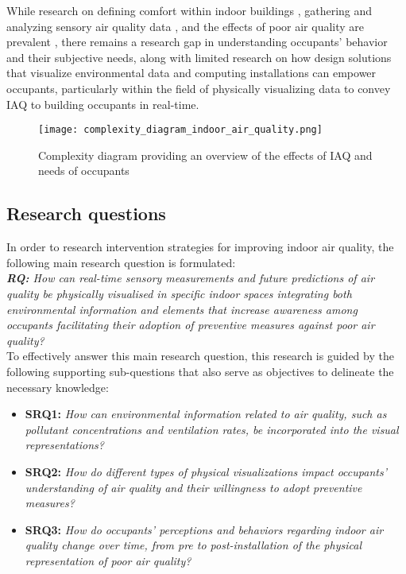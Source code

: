 While research on defining comfort within indoor buildings \cite{alavi_comfort_2017}, gathering and analyzing sensory air quality data \cite{corlan_importance_2021}, and the effects of poor air quality are prevalent \cite{klepeis_national_2001}, there remains a research gap in understanding occupants' behavior and their subjective needs, along with limited research on how design solutions that visualize environmental data and computing installations can empower occupants, particularly within the field of physically visualizing data to convey IAQ to building occupants in real-time. 

\begin{figure}[h]
    \centering
    \texttt{[image: complexity\_diagram\_indoor\_air\_quality.png]}
    \caption{Complexity diagram providing an overview of the effects of IAQ and needs of occupants \cite{schweizer_indoor_2007, wang_how_2021, kim_analyzing_2019, alavi_comfort_2017, corlan_importance_2021, klepeis_national_2001}}
    \label{fig:complexity}
\end{figure}


\subsection{Research questions}

In order to research intervention strategies for improving indoor air quality, the following main research question is formulated: \\

\emph{\textbf{RQ:} How can real-time sensory measurements and future predictions of air quality be physically visualised in specific indoor spaces integrating both environmental information and elements that increase awareness among occupants facilitating their adoption of preventive measures against poor air quality?} \\

To effectively answer this main research question, this research is guided by the following supporting sub-questions that also serve as objectives to delineate the necessary knowledge: \\

\begin{itemize}
    \item \textbf{SRQ1:} \emph{How can environmental information related to air quality, such as pollutant concentrations and ventilation rates, be incorporated into the visual representations?}
    \item \textbf{SRQ2:} \emph{How do different types of physical visualizations impact occupants' understanding of air quality and their willingness to adopt preventive measures?}
    \item \textbf{SRQ3:} \emph{How do occupants' perceptions and behaviors regarding indoor air quality change over time, from pre to post-installation of the physical representation of poor air quality?}\\
\end{itemize}